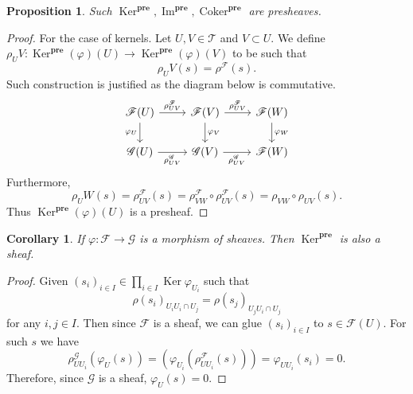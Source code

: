 \documentclass{article}
\newtheorem{proposition}{Proposition}[section]
\newtheorem{corollary}{Corollary}[section]
\numberwithin{equation}{section}
\DeclareMathOperator{\Ker}{Ker}
\DeclareMathOperator{\Image}{Im}
\DeclareMathOperator{\Coker}{Coker}
\begin{document}
\begin{proposition}
Such $\Ker^{\mathbf{pre}},\Image^{\mathbf{pre}},\Coker^{\mathbf{pre}}$ are presheaves.
\end{proposition}

\begin{proof}For the case of kernels.
Let $U,V\in\mathcal{T}$ and $V\subset U$. We define $\rho_UV: \Ker^{\mathbf{pre}}(\varphi)(U) \to\Ker^{\mathbf{pre}}(\varphi)(V)$ to be such that
\begin{equation*}
\rho_UV(s) = \rho^{\mathcal{F}}(s).
\end{equation*}
Such construction is justified as the diagram below is commutative.
\[
\begin{tikzcd}
\mathcal{F}(U) \arrow[r, "\rho^{\mathcal{F}}_{UV}"] \arrow[d, "\varphi_U"'] & \mathcal{F}(V) \arrow[d, "\varphi_V"] \arrow[r, "\rho^{\mathcal{F}}_{UV}"] & \mathcal{F}(W) \arrow[d, "\varphi_W"] \\
\mathcal{G}(U) \arrow[r, "\rho^{\mathcal{G}}_{UV}"']                        & \mathcal{G}(V) \arrow[r, "\rho^{\mathcal{G}}_{UV}"']                       & \mathcal{F}(W)                       
\end{tikzcd}
\]
Furthermore,
\begin{equation*}
\rho_UW(s) = \rho^{\mathcal{F}}_{UV}(s)=\rho^{\mathcal{F}}_{VW}\circ\rho^{\mathcal{F}}_{UV}(s) = \rho_{VW}\circ\rho_{UV}(s).
\end{equation*}
Thus $\Ker^{\mathbf{pre}}(\varphi)(U)$ is a presheaf.
\end{proof}

\begin{corollary}
If $\varphi:\mathcal{F}\to\mathcal{G}$ is a morphism of sheaves. Then $\Ker^{\mathbf{pre}}$ is also a sheaf.
\end{corollary}

\begin{proof}
Given $(s_i)_{i\in I}\in\prod_{i\in I}\Ker\varphi_{U_i}$ such that
\begin{equation*}
\rho(s_i)_{U_iU_i\cap U_j}=\rho(s_j)_{U_jU_i\cap U_j}
\end{equation*}
for any $i,j\in I$. Then since $\mathcal{F}$ is a sheaf, we can glue $(s_i)_{i\in I}$ to $s\in\mathcal{F}(U)$. For such $s$ we have
\begin{equation*}
\rho^{\mathcal{G}}_{UU_i}(\varphi_U(s)) = (\varphi_{U_i}(\rho^{\mathcal{F}}_{UU_i}(s))) = \varphi_{UU_i}(s_i) = 0.
\end{equation*}
Therefore, since $\mathcal{G}$ is a sheaf, $\varphi_U(s)=0$.
\end{proof}
\end{document}

